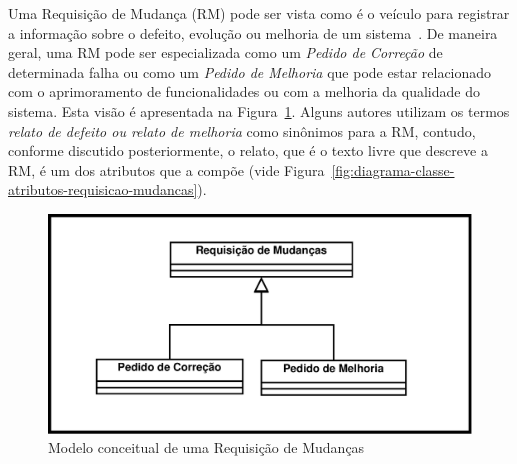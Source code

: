 


Uma Requisição de Mudança (RM) pode ser vista como é o veículo para registrar a
informação sobre o defeito, evolução ou melhoria de um
sistema~\cite{tripathy2014software}. De maneira geral, uma RM pode ser
especializada como um \textit{Pedido de Correção} de determinada falha ou como
um \textit{Pedido de Melhoria} que pode estar relacionado com o aprimoramento de
funcionalidades ou com a melhoria da qualidade do sistema. Esta visão é
apresentada na Figura~\ref{fig:diagrama-classe-requisicao-mudancas}. Alguns
autores utilizam os termos \textit{relato de defeito ou relato de melhoria} como
sinônimos para a RM, contudo, conforme discutido posteriormente, o relato, que é
o texto livre que descreve a RM, é um dos atributos que a compõe (vide
Figura~\ref{fig:diagrama-classe-atributos-requisicao-mudancas}).

\begin{figure}[htpb]
	\centering
	\includegraphics[width=0.8\linewidth]{./chapter-manutencao-software-visao-geral/img/diagrama-classe-conceitual-requisicao-mudancas.pdf}
	\caption{Modelo conceitual de uma Requisição de Mudanças}
\label{fig:diagrama-classe-requisicao-mudancas}
\end{figure}
\todoend{}


